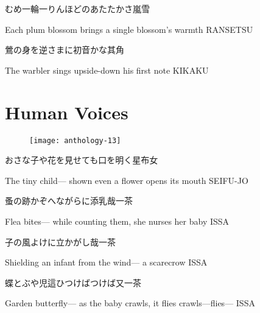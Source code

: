 \begin{haiku}
    {\FH むめ一輪一りんほどのあたたかさ}\hfill{\FH 嵐雪}

    \vin{} Each plum blossom
    \vin{} \vin{} brings a single blossom's
    \vin{} \vin{} \vin{} warmth \hspace{\fill} RANSETSU
\end{haiku}

\begin{haiku}
    {\FH 鶯の身を逆さまに初音かな}\hfill{\FH 其角}

    \vin{} The warbler
    \vin{} \vin{} sings upside-down
    \vin{} \vin{} \vin{} his first note \hspace{\fill} KIKAKU
\end{haiku}

\chapter{Human Voices}

\begin{figure}
    \texttt{[image: anthology-13]}
\end{figure}

\begin{haiku}
    {\FH おさな子や花を見せても口を明く}\hfill{\FH 星布女}

    \vin{} The tiny child---
    \vin{} \vin{} shown even a flower
    \vin{} \vin{} \vin{} opens its mouth \hspace{\fill} SEIFU-JO
\end{haiku}

\begin{haiku}
    {\FH 蚤の跡かぞへながらに添乳哉}\hfill{\FH 一茶}

    \vin{} Flea bites---
    \vin{} \vin{} while counting them, she nurses
    \vin{} \vin{} \vin{} her baby \hspace{\fill} ISSA
\end{haiku}

\begin{haiku}
    {\FH {}子の風よけに立かがし哉}\hfill{\FH 一茶}

    \vin{} Shielding an infant
    \vin{} \vin{} from the wind---
    \vin{} \vin{} \vin{} a scarecrow \hspace{\fill} ISSA
\end{haiku}

\begin{haiku}
    {\FH 蝶とぶや児這ひつけばつけば又}\hfill{\FH 一茶}

    \vin{} Garden butterfly---
    \vin{} \vin{} as the baby crawls, it flies
    \vin{} \vin{} \vin{} crawls---flies--- \hspace{\fill} ISSA
\end{haiku}

